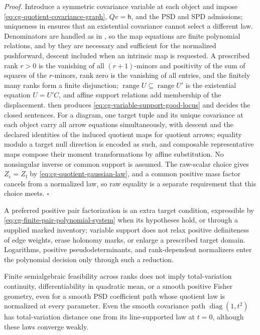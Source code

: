 \noindent\emph{Proof.}
Introduce a symmetric covariance variable at each object and impose
\eqref{eq:cg-quotient-covariance-graph}, \(Qv=\mathsf h\), and the PSD and SPD
admissions; uniqueness in  ensures
that an existential covariance cannot select a different law. Denominators are
handled as in , so the map equations are
finite polynomial relations, and by  they are
necessary and sufficient for the normalized pushforward, descent included when
an intrinsic map is requested. A prescribed rank \(r>0\) is the vanishing of
all \((r+1)\)-minors and positivity of the sum of squares of the \(r\)-minors,
rank zero is the vanishing of all entries, and the finitely many ranks form a
finite disjunction; \(\operatorname{range}U\subseteq\operatorname{range}U'\) is
the existential equation \(U=U'C\), and affine support relations add membership
of the displacement.  then produces
\eqref{eq:cg-variable-support-good-locus} and decides the closed sentences. For
a diagram, one target tuple and its unique covariance at each object carry all
arrow equations simultaneously, with descent and the declared identities of the
induced quotient maps for quotient arrows; equality modulo a target null
direction is encoded as such, and composable representative maps compose their
moment transformations by affine substitution. No nonsingular inverse or common
support is assumed. The raw-scalar choice gives \(Z_{\mathrm c}=Z_{\mathrm f}\) by
\eqref{eq:cg-quotient-gaussian-law}, and a common positive mass factor cancels
from a normalized law, so raw equality is a separate requirement that this
choice meets. \(\square\)

A preferred positive pair factorization is an extra target condition,
expressible by \eqref{eq:cg-finite-pair-polynomial-system} when its hypotheses
hold, or through a supplied marked inventory; variable support does not relax
positive definiteness of edge weights, erase holonomy marks, or enlarge a
prescribed target domain. Logarithms, positive pseudodeterminants, and
rank-dependent normalizers enter the polynomial decision only through such a
reduction.

Finite semialgebraic feasibility across ranks does not imply total-variation
continuity, differentiability in quadratic mean, or a smooth positive Fisher
geometry, even for a smooth PSD coefficient path whose quotient law is
normalized at every parameter. Even the smooth covariance path
\(\operatorname{diag}(1,t^2)\) has total-variation distance one from its
line-supported law at \(t=0\), although these laws converge weakly.

